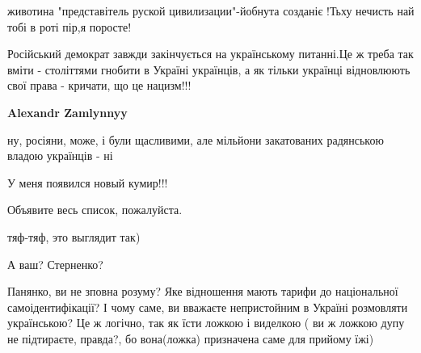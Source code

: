 \begin{itemize}
животина "представітель руской цивилизации"-йобнута созданіє !Тьху нечисть най тобі в роті пір,я поросте!


Російський демократ завжди закінчується на українському питанні.Це ж треба так вміти - століттями гнобити в Україні українців, а як тільки українці відновлюють свої права - кричати, що це нацизм!!!

\begin{itemize}

\textbf{Alexandr Zamlynnyy} 

ну, росіяни, може, і були щасливими, але мільйони закатованих радянською владою українців - ні

\end{itemize}


У меня появился новый кумир!!!

\begin{itemize}

Объявите весь список, пожалуйста.


тяф-тяф, это выглядит так)


А ваш? Стерненко?

\end{itemize}



Панянко, ви не зповна розуму? Яке відношення мають тарифи до національної
самоідентифікації? І чому саме, ви вважаєте непристойним в Україні розмовляти
українською? Це ж логічно, так як їсти ложкою і виделкою ( ви ж ложкою дупу не
підтираєте, правда?, бо вона(ложка) призначена саме для прийому їжі)


\end{itemize}
